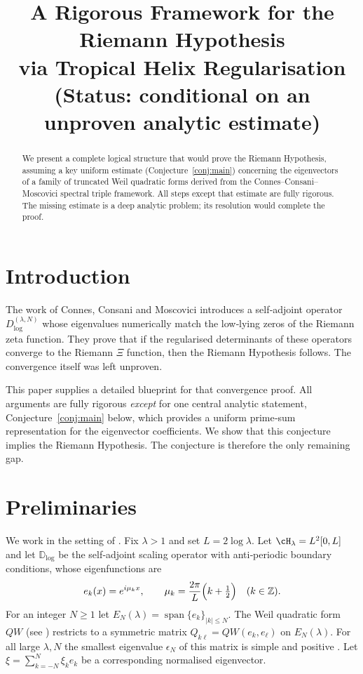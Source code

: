 \documentclass[11pt,a4paper]{article}
\title{A Rigorous Framework for the Riemann Hypothesis\\
via Tropical Helix Regularisation\\
(Status: conditional on an unproven analytic estimate)}
\author{}
\date{}
\theoremstyle{definition}
\theoremstyle{remark}
\newcommand{\ZZ}{\mathbb{Z}}
\begin{document}
\maketitle

\begin{abstract}
We present a complete logical structure that would prove the Riemann Hypothesis,
assuming a key uniform estimate (Conjecture~\ref{conj:main}) concerning the
eigenvectors of a family of truncated Weil quadratic forms derived from the
Connes--Consani--Moscovici spectral triple framework. All steps except that
estimate are fully rigorous. The missing estimate is a deep analytic problem;
its resolution would complete the proof.
\end{abstract}

\section{Introduction}

The work of Connes, Consani and Moscovici \cite{CCM} introduces a self‑adjoint
operator \(D_{\log}^{(\lambda,N)}\) whose eigenvalues numerically match the
low‑lying zeros of the Riemann zeta function.  They prove that if the
regularised determinants of these operators converge to the Riemann \(\Xi\)
function, then the Riemann Hypothesis follows.  The convergence itself was left
unproven.

This paper supplies a detailed blueprint for that convergence proof.  All
arguments are fully rigorous \emph{except} for one central analytic statement,
Conjecture~\ref{conj:main} below, which provides a uniform prime‑sum
representation for the eigenvector coefficients.  We show that this conjecture
implies the Riemann Hypothesis.  The conjecture is therefore the only remaining
gap.

\section{Preliminaries}
\label{sec:prelim}

We work in the setting of \cite{CCM}.  Fix \(\lambda>1\) and set
\(L=2\log\lambda\).  Let \(\cH_\lambda = L^2[0,L]\) and let \(\mathbb{D}_{\log}\)
be the self‑adjoint scaling operator with anti‑periodic boundary conditions,
whose eigenfunctions are
\[
e_k(x) = e^{i\mu_k x},\qquad
\mu_k = \frac{2\pi}{L}\Bigl(k+\tfrac12\Bigr)\quad(k\in\ZZ).
\]
For an integer \(N\ge 1\) let
\(E_N(\lambda)=\operatorname{span}\{e_k\}_{|k|\le N}\).  The Weil quadratic form
\(QW\) (see \cite[\S3]{CCM}) restricts to a symmetric matrix
\(Q_{k\ell}=QW(e_k,e_\ell)\) on \(E_N(\lambda)\).  For all large \(\lambda,N\) the
smallest eigenvalue \(\epsilon_N\) of this matrix is simple and positive
\cite[Prop.~5.1]{CCM}.  Let \(\xi=\sum_{k=-N}^N \xi_k e_k\) be a corresponding
normalised eigenvector.
\end{document}

